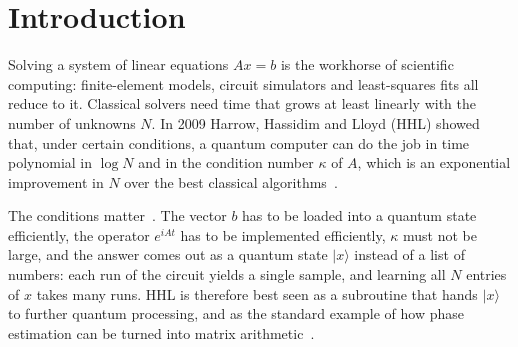 \documentclass[manuscript,screen,review,nonacm]{acmart}
\newcommand{\ket}[1]{\lvert #1\rangle}
\begin{document}


\maketitle

\section{Introduction}
\label{sec:intro}

Solving a system of linear equations $Ax=b$ is the workhorse of scientific
computing: finite-element models, circuit simulators and least-squares fits
all reduce to it. Classical solvers need time that grows at least linearly
with the number of unknowns $N$. In 2009 Harrow, Hassidim and Lloyd (HHL)
showed that, under certain conditions, a quantum computer can do the job in
time polynomial in $\log N$ and in the condition number $\kappa$ of $A$,
which is an exponential improvement in $N$ over the best classical
algorithms~\cite{harrow2009}.

The conditions matter~\cite{aaronson2015}. The vector $b$ has to be loaded
into a quantum state efficiently, the operator $e^{iAt}$ has to be
implemented efficiently, $\kappa$ must not be large, and the answer comes out
as a quantum state $\ket{x}$ instead of a list of numbers: each run of the
circuit yields a single sample, and learning all $N$ entries of $x$ takes
many runs. HHL is therefore best seen as a subroutine that hands $\ket{x}$ to
further quantum processing, and as the standard example of how phase
estimation can be turned into matrix arithmetic~\cite{dervovic2018}.
\end{document}
